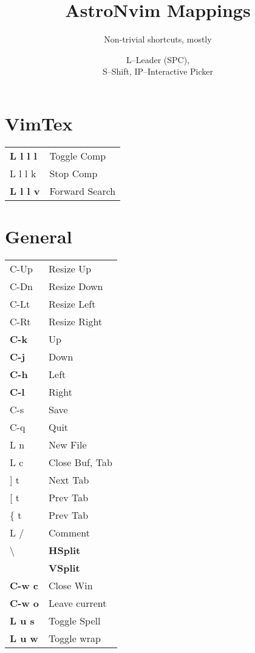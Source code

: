\documentclass[
  ,landscape
  ,columns=4
]{cheatsheet}
\title{AstroNvim Mappings}
\author{Non-trivial shortcuts, mostly}
\date{L--Leader (SPC),\\S--Shift, IP--Interactive Picker}
\begin{document}
\maketitle

\section{VimTex}

\begin{tabular}{ll}
	\textbf{L l l l} & Toggle Comp    \\
	L l l k          & Stop Comp      \\
	\textbf{L l l v} & Forward Search \\
\end{tabular}

\section{General}

\begin{tabular}{l>{\color{black}}l}
	C-Up           & Resize Up       \\
	C-Dn           & Resize Down     \\
	C-Lt           & Resize Left     \\
	C-Rt           & Resize Right    \\
	\textbf{C-k}   & Up              \\
	\textbf{C-j}   & Down            \\
	\textbf{C-h}   & Left            \\
	\textbf{C-l}   & Right           \\
	C-s            & Save            \\
	C-q            & Quit            \\
	L n            & New File        \\
	L c            & Close Buf, Tab  \\
	{]} t          & Next Tab        \\
	{[} t          & Prev Tab        \\
	\{ t           & Prev Tab        \\
	L /            & Comment         \\
	\textbackslash & \textbf{HSplit} \\
	\textbar       & \textbf{VSplit} \\
	\textbf{C-w c} & Close Win       \\
	\textbf{C-w o} & Leave current   \\
	\textbf{L u s} & Toggle Spell    \\
	\textbf{L u w} & Toggle wrap     \\
\end{tabular}
\end{document}
